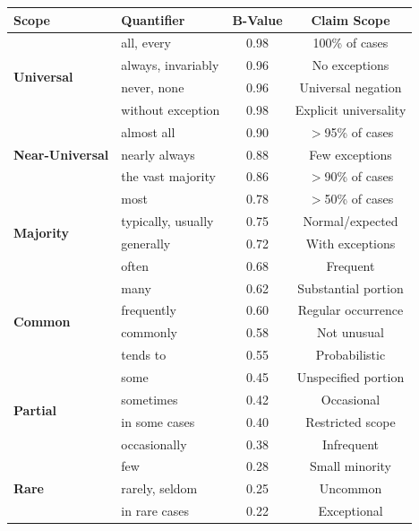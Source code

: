 \documentclass[11pt,a4paper]{article}
\theoremstyle{remark}
\begin{document}
\begin{lexiconbox}[title={Quantifier B-Values}]
\begin{center}
\begin{tabular}{llcc}
\toprule
\textbf{Scope} & \textbf{Quantifier} & \textbf{B-Value} & \textbf{Claim Scope} \\
\midrule
\multirow{4}{*}{\textcolor{strongcolor}{\textbf{Universal}}}
    & all, every & 0.98 & 100\% of cases \\
    & always, invariably & 0.96 & No exceptions \\
    & never, none & 0.96 & Universal negation \\
    & without exception & 0.98 & Explicit universality \\
\midrule
\multirow{3}{*}{\textcolor{strongcolor}{\textbf{Near-Universal}}}
    & almost all & 0.90 & $>$95\% of cases \\
    & nearly always & 0.88 & Few exceptions \\
    & the vast majority & 0.86 & $>$90\% of cases \\
\midrule
\multirow{4}{*}{\textcolor{moderatecolor}{\textbf{Majority}}}
    & most & 0.78 & $>$50\% of cases \\
    & typically, usually & 0.75 & Normal/expected \\
    & generally & 0.72 & With exceptions \\
    & often & 0.68 & Frequent \\
\midrule
\multirow{4}{*}{\textcolor{moderatecolor}{\textbf{Common}}}
    & many & 0.62 & Substantial portion \\
    & frequently & 0.60 & Regular occurrence \\
    & commonly & 0.58 & Not unusual \\
    & tends to & 0.55 & Probabilistic \\
\midrule
\multirow{4}{*}{\textcolor{weakcolor}{\textbf{Partial}}}
    & some & 0.45 & Unspecified portion \\
    & sometimes & 0.42 & Occasional \\
    & in some cases & 0.40 & Restricted scope \\
    & occasionally & 0.38 & Infrequent \\
\midrule
\multirow{3}{*}{\textcolor{weakcolor}{\textbf{Rare}}}
    & few & 0.28 & Small minority \\
    & rarely, seldom & 0.25 & Uncommon \\
    & in rare cases & 0.22 & Exceptional \\
\bottomrule
\end{tabular}
\end{center}
\end{lexiconbox}
\end{document}

